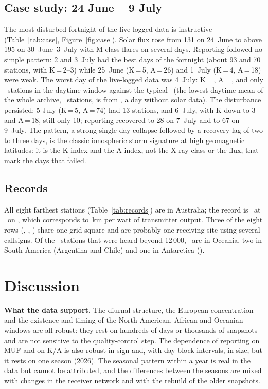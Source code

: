 \documentclass[10pt,a4paper]{article}
\begin{document}
\subsection{Case study: 24 June -- 9 July}
\label{sec:case}
The most disturbed fortnight of the live-logged data is instructive (Table~\ref{tab:case}, Figure~\ref{fig:case}). Solar flux rose from 131 on 24~June to above 195 on 30~June--3~July with M-class flares on several days. Reporting followed no simple pattern: 2 and 3~July had the best days of the fortnight (about 93 and 70 stations, with K\,=\,2--3) while 25~June (K\,=\,5, A\,=\,26) and 1~July (K\,=\,4, A\,=\,18) were weak. The worst day of the live-logged data was 4~July: K\,=\,\caseJulyK, A\,=\,\caseJulyA, and only \caseJulyRep\ stations in the daytime window against the typical \caseTypRep\ (the lowest daytime mean of the whole archive, \worstAllRep\ stations, is from \worstAllDay, a day without solar data). The disturbance persisted: 5 July (K\,=\,5, A\,=\,74) had 13 stations, and 6~July, with K down to 3 and A\,=\,18, still only 10; reporting recovered to 28 on 7~July and to 67 on 9~July. The pattern, a strong single-day collapse followed by a recovery lag of two to three days, is the classic ionospheric storm signature at high geomagnetic latitudes: it is the K-index and the A-index, not the X-ray class or the flux, that mark the days that failed.



\subsection{Records}
All eight farthest stations (Table~\ref{tab:records}) are in Australia; the record is \recBestCall\ at \recBest\km\ on \recBestDate, which corresponds to \wKmW\,km per watt of transmitter output. Three of the eight rows (, , ) share one grid square and are probably one receiving site using several callsigns. Of the \nBeyondBC\ stations that were heard beyond 12\,000\km, \nBeyondBCOc\ are in Oceania, two in South America (Argentina and Chile) and one in Antarctica ().



\section{Discussion}
\label{sec:limits}
\textbf{What the data support.} The diurnal structure, the European concentration and the existence and timing of the North American, African and Oceanian windows are all robust: they rest on hundreds of days or thousands of snapshots and are not sensitive to the quality-control step. The dependence of reporting on MUF and on K/A is also robust in sign and, with day-block intervals, in size, but it rests on one season (2026). The seasonal pattern within a year is real in the data but cannot be attributed, and the differences between the seasons are mixed with changes in the receiver network and with the rebuild of the older snapshots.
\end{document}
